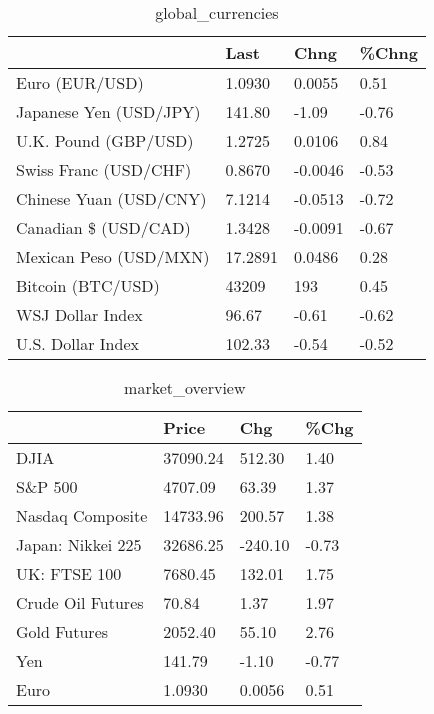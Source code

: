 \documentclass{article}%
\begin{document}
%


\begin{table}[htbp]%
\caption{global\_currencies}%
\centering%
\begin{adjustbox}{width=1\textwidth}%
\begin{tabular}{llll}
\toprule
                       &    Last &    Chng & \%Chng \\
\midrule
        Euro (EUR/USD) &  1.0930 &  0.0055 &  0.51 \\
Japanese Yen (USD/JPY) &  141.80 &   -1.09 & -0.76 \\
  U.K. Pound (GBP/USD) &  1.2725 &  0.0106 &  0.84 \\
 Swiss Franc (USD/CHF) &  0.8670 & -0.0046 & -0.53 \\
Chinese Yuan (USD/CNY) &  7.1214 & -0.0513 & -0.72 \\
  Canadian \$ (USD/CAD) &  1.3428 & -0.0091 & -0.67 \\
Mexican Peso (USD/MXN) & 17.2891 &  0.0486 &  0.28 \\
     Bitcoin (BTC/USD) &   43209 &     193 &  0.45 \\
      WSJ Dollar Index &   96.67 &   -0.61 & -0.62 \\
     U.S. Dollar Index &  102.33 &   -0.54 & -0.52 \\
\bottomrule
\end{tabular}
%
\end{adjustbox}%
\end{table}

%


\begin{table}[htbp]%
\caption{market\_overview}%
\centering%
\begin{adjustbox}{width=1\textwidth}%
\begin{tabular}{llll}
\toprule
                  &    Price &     Chg &  \%Chg \\
\midrule
             DJIA & 37090.24 &  512.30 &  1.40 \\
          S\&P 500 &  4707.09 &   63.39 &  1.37 \\
 Nasdaq Composite & 14733.96 &  200.57 &  1.38 \\
Japan: Nikkei 225 & 32686.25 & -240.10 & -0.73 \\
     UK: FTSE 100 &  7680.45 &  132.01 &  1.75 \\
Crude Oil Futures &    70.84 &    1.37 &  1.97 \\
     Gold Futures &  2052.40 &   55.10 &  2.76 \\
              Yen &   141.79 &   -1.10 & -0.77 \\
             Euro &   1.0930 &  0.0056 &  0.51 \\
\bottomrule
\end{tabular}
%
\end{adjustbox}%
\end{table}

%
\end{document}
